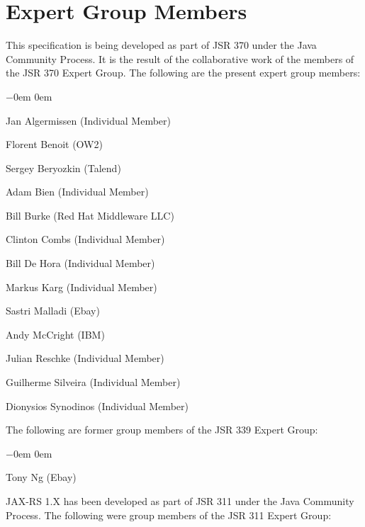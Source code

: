 \section{Expert Group Members} 
\label{expert_group}

This specification is being developed as part of JSR 370 under the Java Community Process. It is the result of the collaborative work of the members of the JSR 370 Expert Group. The following are the present expert group members:

\begin{list}{$-$}{\parsep 0em  0em}
\item Jan Algermissen (Individual Member)
\item Florent Benoit (OW2)
\item Sergey Beryozkin (Talend) 
\item Adam Bien (Individual Member) 
\item Bill Burke (Red Hat Middleware LLC) 
\item Clinton Combs (Individual Member) 
\item Bill De Hora (Individual Member)  
\item Markus Karg (Individual Member) 
\item Sastri Malladi (Ebay) 
\item Andy McCright (IBM)
\item Julian Reschke (Individual Member)
\item Guilherme Silveira (Individual Member) 
\item Dionysios Synodinos (Individual Member)
\end{list}

The following are former group members of the JSR 339 Expert Group:

\begin{list}{$-$}{\parsep 0em  0em}
\item Tony Ng (Ebay)
\end{list}

JAX-RS 1.X has been developed as part of JSR 311 under the Java Community Process. The following were group members of the JSR 311 Expert Group:

